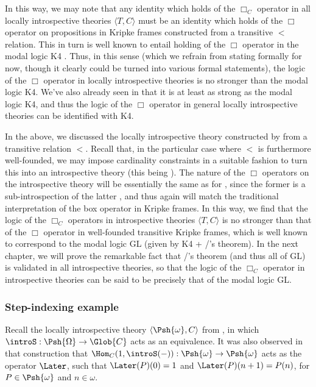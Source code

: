 In this way, we may note that any identity which holds of the $\Box_C$ operator in all locally introspective theories $\langle T, C \rangle$ must be an identity which holds of the $\Box$ operator on propositions in Kripke frames constructed from a transitive $<$ relation. This in turn is well known to entail holding of the $\Box$ operator in the modal logic K4 . Thus, in this sense (which we refrain from stating formally for now, though it clearly could be turned into various formal statements), the logic of the $\Box$ operator in locally introspective theories is no stronger than the modal logic K4. We've also already seen in  that it is at least as strong as the modal logic K4, and thus the logic of the $\Box$ operator in general locally introspective theories can be identified with K4.

In the above, we discussed the locally introspective theory constructed by  from a transitive relation $<$. Recall that, in the particular case where $<$ is furthermore well-founded, we may impose cardinality constraints in a suitable fashion to turn this into an introspective theory (this being ). The nature of the $\Box$ operators on the introspective theory  will be essentially the same as for , since the former is a sub-introspection of the latter , and thus again will match the traditional interpretation of the box operator in Kripke frames. In this way, we find that the logic of the $\Box_C$ operators in introspective theories $\langle T, C \rangle$ is no stronger than that of the $\Box$ operator in well-founded transitive Kripke frames, which is well known to correspond to the modal logic GL (given by K4 + \Loeb/'s theorem). In the next chapter, we will prove the remarkable fact that \Loeb/'s theorem (and thus all of GL) is validated in all introspective theories, so that the logic of the $\Box_C$ operator in introspective theories can be said to be precisely that of the modal logic GL.

\subsubsection{Step-indexing example}
Recall the locally introspective theory $\langle \Psh{\omega}, C \rangle$ from , in which $\introS : \Psh{\Omega} \to \Glob{C}$ acts as an equivalence. It was also observed in that construction that $\Hom_C(1, \introS(-)) : \Psh{\omega} \to \Psh{\omega}$ acts as the operator $\Later$, such that $\Later(P)(0) = 1$ and $\Later(P)(n + 1) = P(n)$, for $P \in \Psh{\omega}$ and $n \in \omega$.

